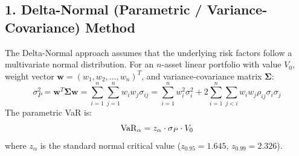 \subsection{1. Delta-Normal (Parametric / Variance-Covariance) Method}

The Delta-Normal approach assumes that the underlying risk factors follow a multivariate normal distribution. For an $n$-asset linear portfolio with value $V_0$, weight vector $\mathbf{w} = (w_1, w_2, \dots, w_n)^T$, and variance-covariance matrix $\boldsymbol{\Sigma}$:
\begin{equation}
\sigma_P^2 = \mathbf{w}^T \boldsymbol{\Sigma} \mathbf{w} = \sum_{i=1}^n \sum_{j=1}^n w_i w_j \sigma_{ij} = \sum_{i=1}^n w_i^2 \sigma_i^2 + 2 \sum_{i=1}^n \sum_{j < i} w_i w_j \rho_{ij} \sigma_i \sigma_j
\end{equation}
The parametric VaR is:
\begin{equation}
\operatorname{VaR}_\alpha = z_\alpha \cdot \sigma_P \cdot V_0
\end{equation}
where $z_\alpha$ is the standard normal critical value ($z_{0.95} = 1.645$, $z_{0.99} = 2.326$).

